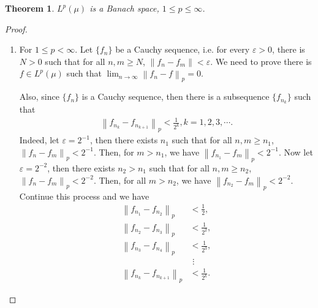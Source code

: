 \documentclass[11pt]{book}
\newtheorem{theorem}{Theorem}[chapter]
\theoremstyle{definition}
\numberwithin{equation}{chapter}
\begin{document}
\begin{theorem}
$L^p(\mu)$ is a Banach space, $1 \leq p \leq \infty$.
\end{theorem}
\begin{proof}
~\begin{enumerate}[label=(\alph*)]
    \item For $1 \leq p < \infty$. Let $\{f_n\}$ be a Cauchy sequence, i.e. for every $\varepsilon > 0$, there is $N > 0$ such that for all $n, m \geq N$, $\left\|f_n - f_m\right\| < \varepsilon$. We need to prove there is $f \in L^p(\mu)$ such that $\lim_{n\to\infty} \left\|f_n - f\right\|_p = 0$. 

    Also, since $\{f_n\}$ is a Cauchy sequence, then there is a subsequence $\{f_{n_k}\}$ such that
    \begin{align*}
        \left\|f_{n_k} - f_{n_{k+1}}\right\|_p < \frac{1}{2^k}, k = 1,2,3,\cdots.
    \end{align*}
    Indeed, let $\varepsilon = 2^{-1}$, then there exists $n_1$ such that for all $n,m \geq n_1$, $\left\|f_{n} - f_{m}\right\|_p < 2^{-1}$. Then, for $m > n_1$, we have $\left\|f_{n_1} - f_{m}\right\|_p < 2^{-1}$. Now let $\varepsilon = 2^{-2}$, then there exists $n_2 > n_1$ such that for all $n,m \geq n_2$, $\left\|f_{n} - f_{m}\right\|_p < 2^{-2}$. Then, for all $m > n_2$, we have $\left\|f_{n_2} - f_{m}\right\|_p < 2^{-2}$. Continue this process and we have
    \begin{align*}
        \left\|f_{n_1} - f_{n_2}\right\|_p & < \frac{1}{2}, \\
        \left\|f_{n_2} - f_{n_3}\right\|_p & < \frac{1}{2^2}, \\
        \left\|f_{n_3} - f_{n_4}\right\|_p & < \frac{1}{2^3},\\
        & \,\, \vdots \\
        \left\|f_{n_k} - f_{n_{k+1}}\right\|_p & < \frac{1}{2^k}.
    \end{align*}


\end{enumerate}
\end{proof}
\end{document}
